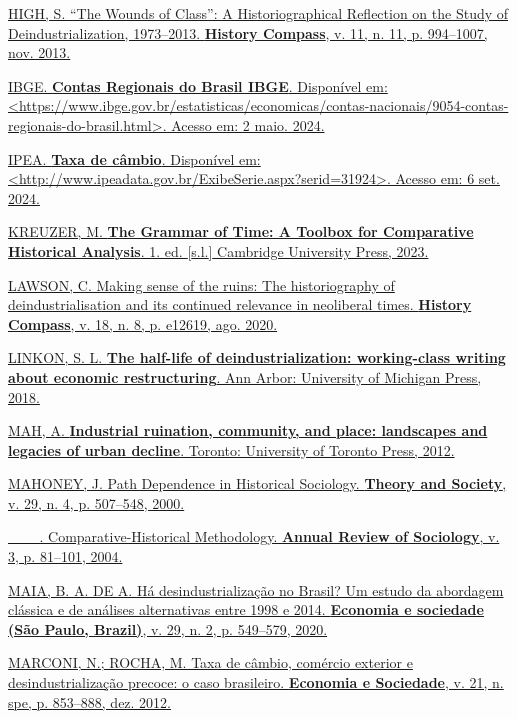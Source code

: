 \href{https://www.zotero.org/google-docs/?p3HTgZ}{HIGH, S. ``The Wounds
of Class'': A Historiographical Reflection on the Study of
Deindustrialization, 1973--2013. \textbf{History Compass}, v. 11, n. 11,
p. 994--1007, nov. 2013.}

\href{https://www.zotero.org/google-docs/?p3HTgZ}{IBGE. \textbf{Contas
Regionais do Brasil \textbar{} IBGE}. Disponível em:
\textless https://www.ibge.gov.br/estatisticas/economicas/contas-nacionais/9054-contas-regionais-do-brasil.html\textgreater.
Acesso em: 2 maio. 2024.}

\href{https://www.zotero.org/google-docs/?p3HTgZ}{IPEA. \textbf{Taxa de
câmbio}. Disponível em:
\textless http://www.ipeadata.gov.br/ExibeSerie.aspx?serid=31924\textgreater.
Acesso em: 6 set. 2024.}

\href{https://www.zotero.org/google-docs/?p3HTgZ}{KREUZER, M.
\textbf{The Grammar of Time: A Toolbox for Comparative Historical
Analysis}. 1. ed. {[}s.l.{]} Cambridge University Press, 2023.}

\href{https://www.zotero.org/google-docs/?p3HTgZ}{LAWSON, C. Making
sense of the ruins: The historiography of deindustrialisation and its
continued relevance in neoliberal times. \textbf{History Compass}, v.
18, n. 8, p. e12619, ago. 2020.}

\href{https://www.zotero.org/google-docs/?p3HTgZ}{LINKON, S. L.
\textbf{The half-life of deindustrialization: working-class writing
about economic restructuring}. Ann Arbor: University of Michigan Press,
2018.}

\href{https://www.zotero.org/google-docs/?p3HTgZ}{MAH, A.
\textbf{Industrial ruination, community, and place: landscapes and
legacies of urban decline}. Toronto: University of Toronto Press, 2012.}

\href{https://www.zotero.org/google-docs/?p3HTgZ}{MAHONEY, J. Path
Dependence in Historical Sociology. \textbf{Theory and Society}, v. 29,
n. 4, p. 507--548, 2000.}

\href{https://www.zotero.org/google-docs/?p3HTgZ}{\_\_\_.
Comparative-Historical Methodology. \textbf{Annual Review of Sociology},
v. 3, p. 81--101, 2004.}

\href{https://www.zotero.org/google-docs/?p3HTgZ}{MAIA, B. A. DE A. Há
desindustrialização no Brasil? Um estudo da abordagem clássica e de
análises alternativas entre 1998 e 2014. \textbf{Economia e sociedade
(São Paulo, Brazil)}, v. 29, n. 2, p. 549--579, 2020.}

\href{https://www.zotero.org/google-docs/?p3HTgZ}{MARCONI, N.; ROCHA, M.
Taxa de câmbio, comércio exterior e desindustrialização precoce: o caso
brasileiro. \textbf{Economia e Sociedade}, v. 21, n. spe, p. 853--888,
dez. 2012.}

